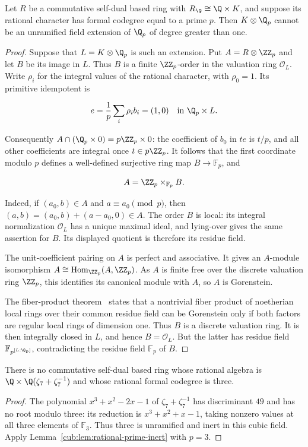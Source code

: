 \begin{lemma}\label{cub:lem:rational-prime-inert}
Let $R$ be a commutative self-dual based ring with
$R_{\Q}\cong\Q\times K$, and suppose its rational
character has formal codegree equal to a prime $p$.
Then $K\otimes\Q_p$ cannot be an unramified field extension
of $\Q_p$ of degree greater than one.
\end{lemma}
\begin{proof}
Suppose that $L=K\otimes\Q_p$ is such an extension.
Put $A=R\otimes\ZZ_p$ and let $B$ be its image in $L$.
Thus $B$ is a finite $\ZZ_p$-order in the valuation ring
$\mathcal O_L$. Write $\rho_i$ for the integral values of the
rational character, with $\rho_0=1$. Its primitive idempotent is

\[
 e=\frac1p\sum_i\rho_i b_i=(1,0)
 \quad\text{in }\Q_p\times L.
\]

Consequently $A\cap(\Q_p\times0)=p\ZZ_p\times0$:
the coefficient of $b_0$ in $te$ is $t/p$, and all other
coefficients are integral once $t\in p\ZZ_p$.
It follows that the first coordinate modulo $p$ defines a
well-defined surjective ring map $B\to\mathbb F_p$, and

\[
 A=\ZZ_p\times_{\mathbb F_p}B.
\]

Indeed, if $(a_0,b)\in A$ and $a\equiv a_0\pmod p$, then
$(a,b)=(a_0,b)+(a-a_0,0)\in A$.
The order $B$ is local: its integral normalization $\mathcal O_L$
has a unique maximal ideal, and lying-over gives the same assertion
for $B$. Its displayed quotient is therefore its residue field.

The unit-coefficient pairing on $A$ is perfect and associative.
It gives an $A$-module isomorphism
$A\cong\operatorname{Hom}_{\ZZ_p}(A,\ZZ_p)$. As $A$ is finite free over
the discrete valuation ring $\ZZ_p$, this identifies its
canonical module with $A$, so $A$ is Gorenstein.

The fiber-product theorem~\cite[Fact~2.6 and Corollary~2.7]{NTV}
states that a
nontrivial fiber product of noetherian local rings over their common
residue field can be Gorenstein only if both factors are regular
local rings of dimension one. Thus $B$ is a discrete valuation ring.
It is then integrally closed in $L$, and hence $B=\mathcal O_L$.
But the latter has residue field $\mathbb F_{p^{[L:\Q_p]}}$,
contradicting the residue field $\mathbb F_p$ of $B$.
\end{proof}

\begin{corollary}\label{cub:cor:cubic-seven-three-impossible}
There is no commutative self-dual based ring whose rational algebra
is $\Q\times\Q(\zeta_7+\zeta_7^{-1})$ and whose
rational formal codegree is three.
\end{corollary}
\begin{proof}
The polynomial $x^3+x^2-2x-1$ of
$\zeta_7+\zeta_7^{-1}$ has discriminant $49$ and has no root
modulo three: its reduction is $x^3+x^2+x-1$, taking nonzero
values at all three elements of $\mathbb F_3$. Thus three is
unramified and inert in this cubic field. Apply
Lemma~\ref{cub:lem:rational-prime-inert} with $p=3$.
\end{proof}


